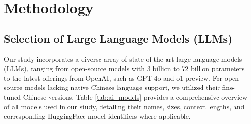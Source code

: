 \section{Methodology}

\subsection{Selection of Large Language Models (LLMs)}

Our study incorporates a diverse array of state-of-the-art large language models (LLMs), ranging from open-source models with 3 billion to 72 billion parameters to the latest offerings from OpenAI, such as GPT-4o and o1-preview. For open-source models lacking native Chinese language support, we utilized their fine-tuned Chinese versions. Table \ref{tab:ai_models} provides a comprehensive overview of all models used in our study, detailing their names, sizes, context lengths, and corresponding HuggingFace model identifiers where applicable.

